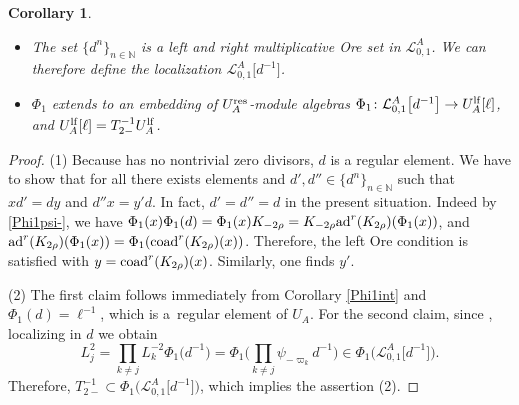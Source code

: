 \documentclass[10pt,a4paper]{amsart}
\numberwithin{equation}{section}
\newtheorem{cor}[teo]{Corollary}
\theoremstyle{definition}
\newcommand{\Ll}{{\mathcal L}}
\newcommand{\ra}{\rightarrow}
\begin{document}
\begin{cor}\label{Phi1int2}\quad
\begin{itemize}\itemsep=0pt
\item[$(1)$] The set $\{d^n\}_{n\in {\mathbb N}}$ is a left and right multiplicative Ore set in $\Ll_{0,1}^A$.
We can therefore define the localization $\Ll_{0,1}^A\big[d^{-1}\big]$.
\item[$(2)$] $\Phi_1$ extends to an embedding of $U_A^{\rm res}$-module algebras $\Phi_1\colon \Ll_{0,1}^A\big[d^{-1}\big] \ra U_A^{\rm lf}[\ell]$, and $U_A^{\rm lf}[\ell] = T_{2-}^{-1}U_A^{\rm lf}$.
\end{itemize}
\end{cor}
\begin{proof} (1) Because \smash{$\Ll_{0,1}^A$} has no nontrivial zero divisors, $d$ is a regular element. We have to show that for all \smash{$x\in \Ll_{0,1}^A$} there exists elements \smash{$y,y'\in\! \Ll_{0,1}^A$} and $d',d'' \in \!\{d^n\}_{n\in {\mathbb N}}$ such that~${xd'\!=\!dy}$ and $d''x=y'd$. In fact, $d'=d''=d$ in the present situation. Indeed by \eqref{Phi1psi-}, we have $\Phi_1(x)\Phi_1(d)=\Phi_1(x)K_{-2\rho}=K_{-2\rho}{\rm ad}^r(K_{2\rho})(\Phi_1(x))$, and ${\rm ad}^r(K_{2\rho})(\Phi_1(x))=\Phi_1({\rm coad}^r(K_{2\rho})(x))$. Therefore, the left Ore condition is satisfied with $y={\rm coad}^r(K_{2\rho})(x)$. Similarly, one finds $y'$.

(2) The first claim follows immediately from Corollary \ref{Phi1int} and $\Phi_1(d)=\ell^{-1}$, which is a~regular element of $U_A$. For the second claim, since , localizing in $d$ we obtain
\[
 L_j^2=\prod_{k\not=j} L_k^{-2 }\Phi_1\big(d^{-1}\big)=\Phi_1\biggl(\prod_{k\not=j} \psi_{-\varpi_k}d^{-1}\biggr) \in \Phi_1\big( \Ll_{0,1}^A\big[d^{-1}\big] \big).
\]
Therefore, $T_{2-}^{-1}\!\subset \Phi_1\bigl( \Ll_{0,1}^A\big[d^{-1}\big] \bigr)$, which implies the assertion (2).
\end{proof}
\end{document}
